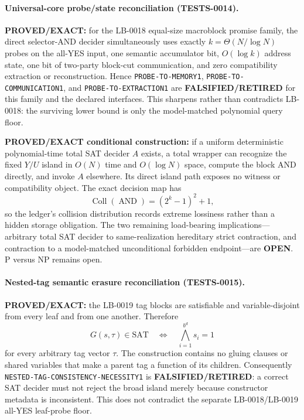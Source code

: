 \documentclass[11pt]{article}
\begin{document}
\paragraph{Universal-core probe/state reconciliation (TESTS-0014).}
\textbf{PROVED/EXACT:} for the LB-0018 equal-size macroblock promise family, the direct selector-AND decider simultaneously uses exactly \(k=\Theta(N/\log N)\) probes on the all-YES input, one semantic accumulator bit, \(O(\log k)\) address state, one bit of two-party block-cut communication, and zero compatibility extraction or reconstruction.  Hence \texttt{PROBE-TO-MEMORY1}, \texttt{PROBE-TO-COMMUNICATION1}, and \texttt{PROBE-TO-EXTRACTION1} are \textbf{FALSIFIED/RETIRED} for this family and the declared interfaces.  This sharpens rather than contradicts LB-0018: the surviving lower bound is only the model-matched polynomial query floor.

\textbf{PROVED/EXACT conditional construction:} if a uniform deterministic polynomial-time total SAT decider \(A\) exists, a total wrapper can recognize the fixed \(Y/U\) island in \(O(N)\) time and \(O(\log N)\) space, compute the block AND directly, and invoke \(A\) elsewhere.  Its direct island path exposes no witness or compatibility object.  The exact decision map has
\[
 \operatorname{Coll}(\operatorname{AND})= (2^k-1)^2+1,
\]
so the ledger's collision distribution records extreme lossiness rather than a hidden storage obligation.  The two remaining load-bearing implications---arbitrary total SAT decider to same-realization hereditary strict contraction, and contraction to a model-matched unconditional forbidden endpoint---are \textbf{OPEN}.  P versus NP remains open.


\paragraph{Nested-tag semantic erasure reconciliation (TESTS-0015).}
\textbf{PROVED/EXACT:} the LB-0019 tag blocks are satisfiable and variable-disjoint from every leaf and from one another.  Therefore
\[
 G(s,\tau)\in\mathrm{SAT}\quad\Longleftrightarrow\quad
 \bigwedge_{i=1}^{b^d}s_i=1
\]
for every arbitrary tag vector \(\tau\).  The construction contains no gluing
clauses or shared variables that make a parent tag a function of its children.
Consequently \texttt{NESTED-TAG-CONSISTENCY-NECESSITY1} is
\textbf{FALSIFIED/RETIRED}: a correct SAT decider must not reject the broad
island merely because constructor metadata is inconsistent.  This does not
contradict the separate LB-0018/LB-0019 all-YES leaf-probe floor.
\end{document}
